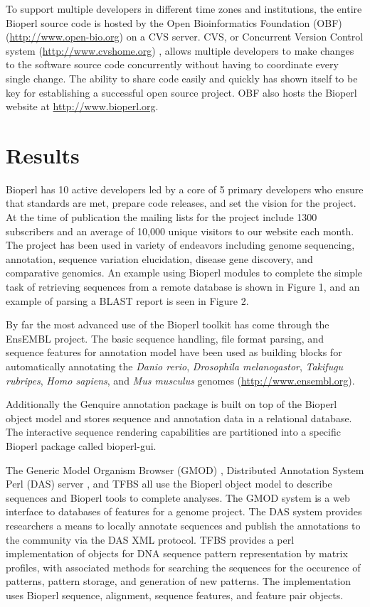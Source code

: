 \documentclass[12pt]{article}
\begin{document}
To support multiple developers in different time zones and
institutions, the entire Bioperl source code is hosted by the Open
Bioinformatics Foundation (OBF) (\url{http://www.open-bio.org}) on a
CVS server.  CVS, or Concurrent Version Control system
(\url{http://www.cvshome.org}) \cite{cvsbook}, allows multiple
developers to make changes to the software source code concurrently
without having to coordinate every single change.  The ability to
share code easily and quickly has shown itself to be key for
establishing a successful open source project.  OBF also hosts the
Bioperl website at \url{http://www.bioperl.org}.

\section{Results}

Bioperl has 10 active developers led by a core of 5 primary developers
who ensure that standards are met, prepare code releases, and set the
vision for the project.  At the time of publication the mailing lists
for the project include 1300 subscribers and an average of 10,000
unique visitors to our website each month.  The project has been used
in variety of endeavors including genome sequencing, annotation,
sequence variation elucidation, disease gene discovery, and
comparative genomics.  An example using Bioperl modules to complete
the simple task of retrieving sequences from a remote database is
shown in Figure 1, and an example of parsing a BLAST report is
seen in Figure 2.

By far the most advanced use of the Bioperl toolkit has come through
the EnsEMBL\cite{ensembl-nar} project.  The basic sequence handling,
file format parsing, and sequence features for annotation model have
been used as building blocks for automatically annotating the
\textit{Danio rerio}, \textit{Drosophila melanogastor},
\textit{Takifugu rubripes}, \textit{Homo sapiens}, and \textit{Mus
musculus} genomes (\url{http://www.ensembl.org}).

Additionally the Genquire\cite{genquire} annotation package is built
on top of the Bioperl object model and stores sequence and annotation
data in a relational database.  The interactive sequence rendering
capabilities are partitioned into a specific Bioperl package called
bioperl-gui.

The Generic Model Organism Browser (GMOD) \cite{gmod}, Distributed
Annotation System Perl (DAS) server \cite{das}, and TFBS
\cite{tfbs} all use the Bioperl object model to describe sequences and
Bioperl tools to complete analyses.  The GMOD system is a web
interface to databases of features for a genome project.  The DAS
system provides researchers a means to locally annotate sequences and
publish the annotations to the community via the DAS XML protocol.
TFBS provides a perl implementation of objects for DNA sequence pattern
representation by matrix profiles, with associated methods for searching
the sequences for the occurence of patterns, pattern storage, and
generation of new patterns. The implementation uses Bioperl sequence,
alignment, sequence features, and feature pair objects.
\end{document}
